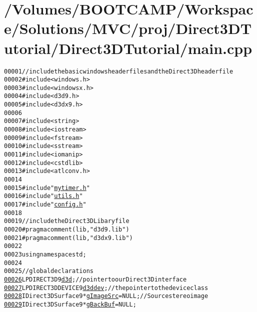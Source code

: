 \hypertarget{main_8cpp_source}{
\section{/Volumes/BOOTCAMP/Workspace/Solutions/MVC/proj/Direct3DTutorial/Direct3DTutorial/main.cpp}
}


\begin{footnotesize}\begin{alltt}
00001 \textcolor{comment}{// include the basic windows header files and the Direct 3D header file}
00002 \textcolor{preprocessor}{#include <windows.h>}
00003 \textcolor{preprocessor}{#include <windowsx.h>}
00004 \textcolor{preprocessor}{#include <d3d9.h>}
00005 \textcolor{preprocessor}{#include <d3dx9.h>}
00006 
00007 \textcolor{preprocessor}{#include <string>}
00008 \textcolor{preprocessor}{#include <iostream>}
00009 \textcolor{preprocessor}{#include <fstream>}
00010 \textcolor{preprocessor}{#include <sstream>}
00011 \textcolor{preprocessor}{#include <iomanip>}
00012 \textcolor{preprocessor}{#include <cstdlib>}
00013 \textcolor{preprocessor}{#include <atlconv.h>}
00014 
00015 \textcolor{preprocessor}{#include "\hyperlink{mytimer_8h}{mytimer.h}"}
00016 \textcolor{preprocessor}{#include "\hyperlink{utils_8h}{utils.h}"}
00017 \textcolor{preprocessor}{#include "\hyperlink{config_8h}{config.h}"}
00018 
00019 \textcolor{comment}{// include the Direct3D Libary file}
00020 \textcolor{preprocessor}{#pragma comment (lib, "d3d9.lib")}
00021 \textcolor{preprocessor}{}\textcolor{preprocessor}{#pragma comment (lib, "d3dx9.lib")}
00022 \textcolor{preprocessor}{}
00023 \textcolor{keyword}{using namespace }std;
00024 
00025 \textcolor{comment}{// global declarations}
\hypertarget{main_8cpp_source_l00026}{}\hyperlink{main_8cpp_aa8a3bb0b341846489cc307333d1d9811}{00026} LPDIRECT3D9 \hyperlink{main_8cpp_aa8a3bb0b341846489cc307333d1d9811}{d3d};\textcolor{comment}{//pointer to our Direct3D interface}
\hypertarget{main_8cpp_source_l00027}{}\hyperlink{main_8cpp_a1c4528473f1127613d4edcaac0dad7f1}{00027} LPDIRECT3DDEVICE9 \hyperlink{main_8cpp_a1c4528473f1127613d4edcaac0dad7f1}{d3ddev};\textcolor{comment}{// the pointer to the device class}
\hypertarget{main_8cpp_source_l00028}{}\hyperlink{main_8cpp_a35944f88a0c5556a08bd1da88b8d89db}{00028} IDirect3DSurface9*      \hyperlink{main_8cpp_a35944f88a0c5556a08bd1da88b8d89db}{gImageSrc} = NULL; \textcolor{comment}{//Source stereo image}
\hypertarget{main_8cpp_source_l00029}{}\hyperlink{main_8cpp_a94593fcbf19d34c0830799636182170e}{00029} IDirect3DSurface9* \hyperlink{main_8cpp_a94593fcbf19d34c0830799636182170e}{gBackBuf} = NULL;

\end{alltt}
\end{footnotesize}
